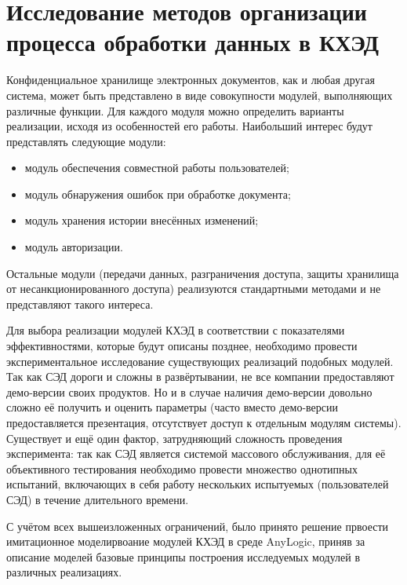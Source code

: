 \section{Исследование методов организации процесса обработки данных в КХЭД} \label{experiment}

Конфиденциальное хранилище электронных документов, как и любая другая система, может быть представлено в виде совокупности модулей, выполняющих различные функции. %
Для каждого модуля можно определить варианты реализации, исходя из особенностей его работы. Наибольший интерес будут представлять следующие модули:
\begin{itemize}
	\item модуль обеспечения совместной работы пользователей;
	\item модуль обнаружения ошибок при обработке документа;
	\item модуль хранения истории внесённых изменений;
	\item модуль авторизации.
\end{itemize}
Остальные модули (передачи данных, разграничения доступа, защиты хранилища от несанкционированного доступа) реализуются стандартными методами и не представляют такого интереса.

\vspace{\baselineskip}
Для выбора реализации модулей КХЭД в соответствии с показателями эффективностями, которые будут описаны позднее, необходимо провести экспериментальное исследование существующих реализаций подобных модулей. Так как СЭД дороги и сложны в развёртывании, не все компании предоставляют демо-версии своих продуктов. Но и в случае наличия демо-версии довольно сложно её получить и оценить параметры (часто вместо демо-версии предоставляется презентация, отсутствует доступ к отдельным модулям системы). Существует и ещё один фактор, затрудняющий сложность проведения эксперимента: так как СЭД является системой массового обслуживания, для её объективного тестирования необходимо провести множество однотипных испытаний, включающих в себя работу нескольких испытуемых (пользователей СЭД) в течение длительного времени.

\vspace{\baselineskip}
С учётом всех вышеизложенных ограничений, было принято решение првоести имитационное моделирвоание модулей КХЭД в среде AnyLogic, приняв за описание моделей базовые принципы построения исследуемых модулей в различных реализациях.

